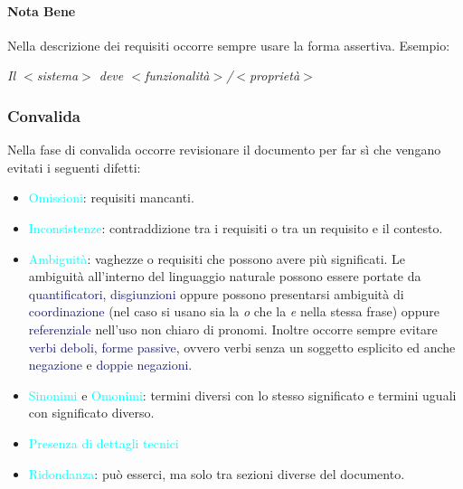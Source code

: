 \paragraph{Nota Bene} Nella descrizione dei requisiti occorre sempre usare la forma assertiva.
Esempio:
\begin{center}
    \emph{Il $<$sistema$>$ deve $<$funzionalità$>$/$<$proprietà$>$}
\end{center}

\subsubsection{Convalida}

Nella fase di convalida occorre revisionare il documento per far sì che vengano
evitati i seguenti difetti:

\begin{itemize}
    \item \textcolor{cyan}{Omissioni}: requisiti mancanti.
    \item \textcolor{cyan}{Inconsistenze}: contraddizione tra i requisiti o tra un requisito e il contesto.
    \item \textcolor{cyan}{Ambiguità}: vaghezze o requisiti che possono avere più significati. Le ambiguità all'interno del linguaggio naturale
        possono essere portate da \textcolor{MidnightBlue}{quantificatori}, \textcolor{MidnightBlue}{disgiunzioni}
        oppure possono presentarsi ambiguità di \textcolor{MidnightBlue}{coordinazione} (nel caso si usano sia la \emph{o} che la \emph{e} nella stessa frase) oppure 
        \textcolor{MidnightBlue}{referenziale} nell'uso non chiaro di pronomi.
        Inoltre occorre sempre evitare \textcolor{MidnightBlue}{verbi deboli}, \textcolor{MidnightBlue}{forme passive}, ovvero verbi senza un soggetto esplicito ed anche \textcolor{MidnightBlue}{negazione}
        e \textcolor{MidnightBlue}{doppie negazioni}.
    \item \textcolor{cyan}{Sinonimi} e \textcolor{cyan}{Omonimi}: termini diversi con lo stesso significato e termini uguali con significato diverso.
    \item \textcolor{cyan}{Presenza di dettagli tecnici}
    \item \textcolor{cyan}{Ridondanza}: può esserci, ma solo tra sezioni diverse del documento.
\end{itemize}

